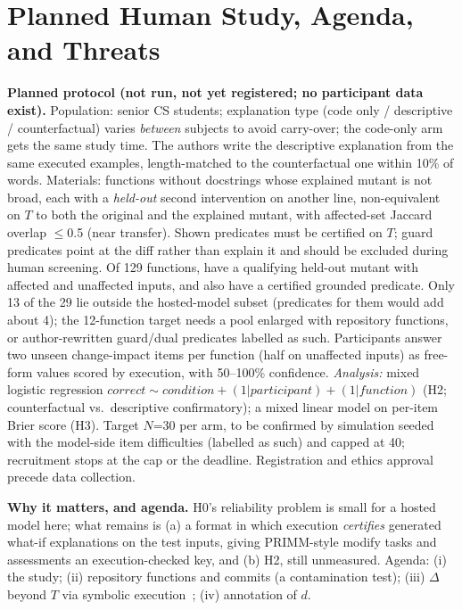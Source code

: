 \section{Planned Human Study, Agenda, and Threats}\label{sec:agenda}
\textbf{Planned protocol (not run, not yet registered; no participant data exist).} Population: senior
CS students; explanation type (code only / descriptive / counterfactual) varies \emph{between} subjects to avoid
carry-over; the code-only arm gets the same study time. The authors write the descriptive explanation from the
same executed examples, length-matched to the counterfactual one within 10\% of words. Materials: functions without
docstrings whose explained mutant is not broad, each with a \emph{held-out} second intervention on another line,
non-equivalent on $T$ to both the original and the explained mutant, with affected-set Jaccard overlap $\le$0.5
(near transfer). Shown predicates must be certified on $T$; guard predicates point at the diff rather than
explain it and should be excluded during human screening. Of 129 functions, \SNEligibleMixedNonbroad{} have
a qualifying held-out mutant with affected and unaffected inputs, and \SNEligibleCertified{} also have a certified grounded
predicate. Only 13 of the 29 lie outside
the hosted-model subset (predicates for them would add about 4); the 12-function target needs a pool enlarged with
repository functions, or author-rewritten guard/dual predicates labelled as such. Participants answer
two unseen change-impact items per function (half on unaffected inputs) as free-form values scored by execution, with
50--100\% confidence.
\emph{Analysis:} mixed logistic regression $\textit{correct}\sim\textit{condition}+(1|\textit{participant})+(1|\textit{function})$
(H2; counterfactual vs.\ descriptive confirmatory); a mixed linear model on per-item Brier score (H3). Target $N$=30 per arm, to be confirmed by simulation seeded with the model-side
item difficulties (labelled as such) and capped at 40; recruitment stops at the cap or the deadline. Registration and ethics
approval precede data collection.

\textbf{Why it matters, and agenda.} H0's reliability problem is small for a hosted model here; what remains is (a) a format
in which execution \emph{certifies} generated what-if explanations on the test inputs, giving PRIMM-style modify tasks and
assessments an execution-checked key, and (b) H2, still unmeasured. Agenda: (i) the study; (ii) repository functions and commits (a contamination test); (iii) $\Delta$ beyond $T$ via
symbolic execution~\cite{person2008dse}; (iv) annotation of $d$.

